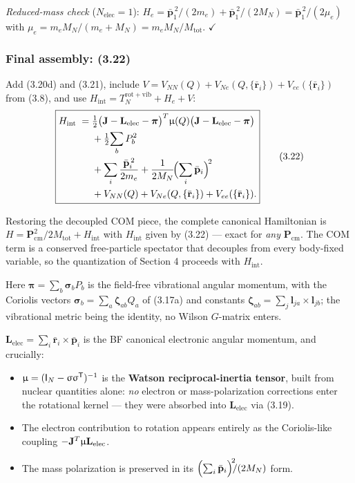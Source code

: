 \emph{Reduced-mass check} ($N_{\mathrm{elec}}=1$): $H_e=\bar{\mathbf{p}}_1^{\,2}/(2m_e)+\bar{\mathbf{p}}_1^{\,2}/(2M_N)=\bar{\mathbf{p}}_1^{\,2}/(2\mu_e)$ with $\mu_e=m_eM_N/(m_e+M_N)=m_eM_N/M_{\mathrm{tot}}$. $\checkmark$

\subsubsection{Final assembly: (3.22)}

Add (3.20d) and (3.21), include $V = V_{NN}(Q)+V_{Ne}(Q,\{\bar{\mathbf{r}}_i\})+V_{ee}(\{\bar{\mathbf{r}}_i\})$ from (3.8), and use $H_{\mathrm{int}} = T_N^{\mathrm{rot+vib}}+H_e+V$:
\begin{equation}
\boxed{
\begin{aligned}
H_{\mathrm{int}}\;=\;& \tfrac12\bigl(\mathbf{J}-\mathbf{L}_{\mathrm{elec}}-\boldsymbol{\pi}\bigr)^T\upmu(Q)\bigl(\mathbf{J}-\mathbf{L}_{\mathrm{elec}}-\boldsymbol{\pi}\bigr) \\
& +\tfrac12\!\sum_{b}P_b^2 \\
& +\sum_i\frac{\bar{\mathbf{p}}_i^{\,2}}{2m_e}+\frac{1}{2M_N}\!\Bigl(\sum_i\bar{\mathbf{p}}_i\Bigr)^{\!2} \\
& +V_{NN}(Q)+V_{Ne}(Q,\{\bar{\mathbf{r}}_i\})+V_{ee}(\{\bar{\mathbf{r}}_i\}).
\end{aligned}}\tag{3.22}
\end{equation}

Restoring the decoupled COM piece, the complete canonical Hamiltonian is $H = \mathbf{P}_{\mathrm{cm}}^2/2M_{\mathrm{tot}} + H_{\mathrm{int}}$ with $H_{\mathrm{int}}$ given by (3.22) --- exact for \emph{any} $\mathbf{P}_{\mathrm{cm}}$. The COM term is a conserved free-particle spectator that decouples from every body-fixed variable, so the quantization of Section 4 proceeds with $H_{\mathrm{int}}$.

Here $\boldsymbol{\pi}=\sum_b\boldsymbol{\sigma}_bP_b$ is the field-free vibrational angular momentum, with the Coriolis vectors $\boldsymbol{\sigma}_b=\sum_a\boldsymbol{\zeta}_{ab}Q_a$ of (3.17a) and constants $\boldsymbol{\zeta}_{ab}=\sum_j\mathbf{l}_{ja}\!\times\!\mathbf{l}_{jb}$; the vibrational metric being the identity, no Wilson $G$-matrix enters.

$\mathbf{L}_{\mathrm{elec}}=\sum_i\bar{\mathbf{r}}_i\!\times\!\bar{\mathbf{p}}_i$ is the BF canonical electronic angular momentum, and crucially:
\begin{itemize}
    \item $\upmu=(\mathsf{I}_N-\upsigma\upsigma^{\mathsf T})^{-1}$ is the \textbf{Watson reciprocal-inertia tensor}, built from nuclear quantities alone: \emph{no} electron or mass-polarization corrections enter the rotational kernel --- they were absorbed into $\mathbf{L}_{\mathrm{elec}}$ via (3.19).
    \item The electron contribution to rotation appears entirely as the Coriolis-like coupling $-\mathbf{J}^T\upmu\mathbf{L}_{\mathrm{elec}}$.
    \item The mass polarization is preserved in its $\Bigl(\sum_i\bar{\mathbf{p}}_i\Bigr)^{\!2}\!\!/(2M_N)$ form.
\end{itemize}

